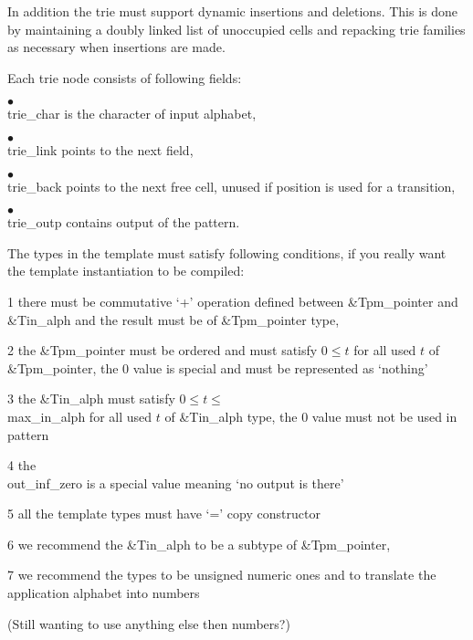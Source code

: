 In addition the trie must support dynamic insertions and deletions. This
is done by maintaining a doubly linked list of unoccupied cells and
repacking trie families as necessary when insertions are made.

Each trie node consists of following fields:

\item{$\bullet$} \\{trie\_char} is the character of input alphabet,
\item{$\bullet$} \\{trie\_link} points to the next field,
\item{$\bullet$} \\{trie\_back} points to the next free cell, unused if
position is used for a transition,
\item{$\bullet$} \\{trie\_outp} contains output of the pattern.

The types in the template must satisfy following conditions, if you
really want the template instantiation to be compiled:

\item 1 there must be commutative `+' operation defined between
\&{Tpm\_pointer} and \&{Tin\_alph} and the result must be of
\&{Tpm\_pointer} type,
\item 2 the \&{Tpm\_pointer} must be ordered and must satisfy
$0\le t$ for all used $t$ of \&{Tpm\_pointer}, the $0$ value
is special and must be represented as `nothing'
\item 3 the \&{Tin\_alph} must satisfy $0\le t\le$\\{max\_in\_alph} for all
used $t$
of \&{Tin\_alph} type, the $0$ value must not be used in pattern
\item 4 the \\{out\_inf\_zero} is a special value meaning `no output is
there'
\item 5 all the template types must have `=' copy constructor
\item 6 we recommend the \&{Tin\_alph} to be a subtype of \&{Tpm\_pointer},
\item 7 we recommend the types to be unsigned numeric ones and to
translate the application alphabet into numbers

(Still wanting to use anything else then numbers?)

